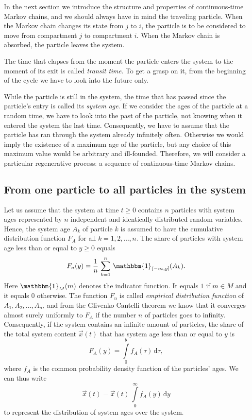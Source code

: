 \documentclass[smallextended]{svjour3}
\newcommand{\suml}{\sum\limits}
\newcommand{\intl}{\int\limits}
\begin{document}
In the next section we introduce the structure and properties of continuous-time Markov chains, and we should always have in mind the traveling particle.
When the Markov chain changes its state from $j$ to $i$, the particle is to be considered to move from compartment $j$ to compartment $i$.
When the Markov chain is absorbed, the particle leaves the system.

The time that elapses from the moment the particle enters the system to the moment of its exit is called \emph{transit time}.
To get a grasp on it, from the beginning of the cycle we have to look into the future only.

While the particle is still in the system, the time that has passed since the particle's entry is called its \emph{system age}.
If we consider the ages of the particle at a random time, we have to look into the past of the particle, not knowing when it entered the system the last time.
Consequently, we have to assume that the particle has ran through the system already infinitely often.
Otherwise we would imply the existence of a maximum age of the particle, but any choice of this maximum value would be arbitrary and ill-founded.
Therefore, we will consider a particular regenerative process: a sequence of continuous-time Markov chains.

\subsection{From one particle to all particles in the system}
Let us assume that the system at time $t\geq0$ contains $n$ particles with system ages represented by $n$ independent and identically distributed random variables.
Hence, the system age $A_k$ of particle $k$ is assumed to have the cumulative distribution function $F_A$ for all $k=1,2,\ldots,n$.
The share of particles with system age less than or equal to $y\geq0$ equals
\[
    F_n(y) = \frac{1}{n}\,\suml_{k=1}^n\,\mathbbm{1}_{(-\infty, y]}(A_k).
\]
Here $\mathbbm{1}_M(m)$ denotes the indicator function.
It equals $1$ if $m\in M$ and it equals $0$ otherwise.
The function $F_n$ is called \emph{empirical distribution function} of $A_1,A_2,\ldots, A_n$, and from the Glivenko-Cantelli theorem \citep{Dudley1999} we know that it converges almost surely uniformly to $F_A$ if the number $n$ of particles goes to infinity.
Consequently, if the system contains an infinite amount of particles, the share of the total system content $\vec{x}(t)$ that has system age less than or equal to $y$ is
\[
    F_A(y) = \intl_0^y f_A(\tau)\,\mathrm{d}\tau,
\]
where $f_A$ is the common probability density function of the particles' ages.
We can thus write
\[
    \vec{x}(t) = \vec{x}(t)\,\intl_0^\infty f_A(y)\,\mathrm{d}y
\]
to represent the distribution of system ages over the system.
\end{document}
